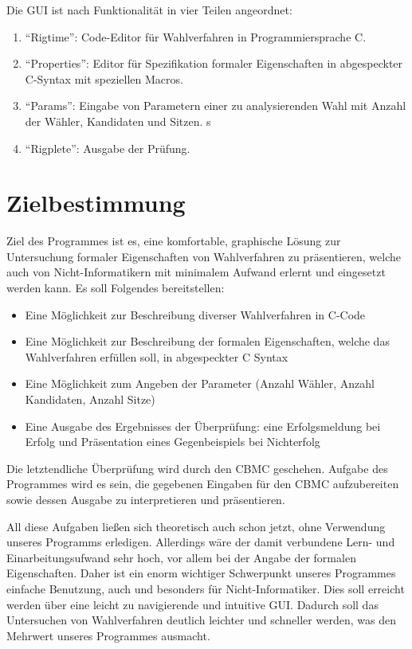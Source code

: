 \documentclass[a4paper]{scrreprt}
\begin{document}
Die \ac{GUI} ist nach Funktionalität in vier Teilen angeordnet:
\begin{enumerate}
\item "`Rigtime"': Code-Editor für Wahlverfahren in Programmiersprache C.
\item "`Properties"': Editor für Spezifikation formaler Eigenschaften in abgespeckter C-Syntax mit speziellen Macros.
\item "`Params"': Eingabe von Parametern einer zu analysierenden Wahl mit Anzahl der Wähler, Kandidaten und Sitzen. s
\item "`Rigplete"': Ausgabe der Prüfung.
\end{enumerate}

\chapter{Zielbestimmung}
Ziel des Programmes ist es, eine komfortable, graphische Lösung zur Untersuchung formaler Eigenschaften von Wahlverfahren zu präsentieren, welche auch von Nicht-Informatikern mit minimalem Aufwand erlernt und eingesetzt werden kann. 
Es soll Folgendes bereitstellen:
\begin{itemize}
\item Eine Möglichkeit zur Beschreibung diverser Wahlverfahren in C-Code  
\item Eine Möglichkeit zur Beschreibung der formalen Eigenschaften, welche das Wahlverfahren erfüllen soll, in abgespeckter C Syntax 
\item Eine Möglichkeit zum Angeben der Parameter (Anzahl Wähler, Anzahl Kandidaten, Anzahl Sitze) 
\item Eine Ausgabe des Ergebnisses der Überprüfung: eine Erfolgsmeldung bei Erfolg und Präsentation eines Gegenbeispiels bei Nichterfolg
\end{itemize}

Die letztendliche Überprüfung wird durch den \ac{CBMC} geschehen. Aufgabe des Programmes wird es sein, die gegebenen Eingaben für den \ac{CBMC} aufzubereiten sowie dessen Ausgabe zu interpretieren und präsentieren. 

All diese Aufgaben ließen sich theoretisch auch schon jetzt, ohne Verwendung unseres Programms erledigen. Allerdings wäre der damit verbundene Lern- und Einarbeitungsufwand sehr hoch, vor allem bei der Angabe der formalen Eigenschaften. Daher ist ein enorm wichtiger Schwerpunkt unseres Programmes einfache Benutzung, auch und besonders für Nicht-Informatiker. Dies soll erreicht werden über eine leicht zu navigierende und intuitive \ac{GUI}. Dadurch soll das Untersuchen von Wahlverfahren deutlich leichter und schneller werden, was den Mehrwert unseres Programmes ausmacht.
\end{document}
